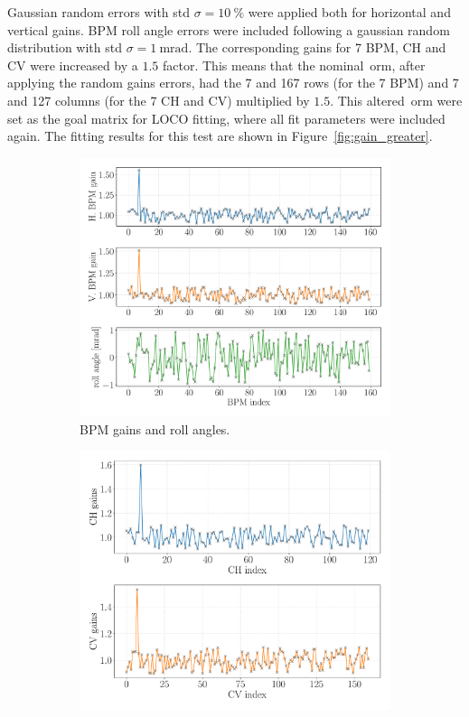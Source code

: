 Gaussian random errors with std $\sigma=\SI{10}{\%}$ were applied both for horizontal and vertical gains. BPM roll angle errors were included following a gaussian random distribution with std $\sigma=\SI{1}{\milli\radian}$.  The corresponding gains for 7 BPM, CH and CV were increased by a $1.5$ factor. This means that the nominal~\gls{orm}, after applying the random gains errors, had the 7 and 167 rows (for the 7 BPM) and 7 and 127 columns (for the 7 CH and CV) multiplied by $1.5$. This altered~\gls{orm} were set as the goal matrix for LOCO fitting, where all fit parameters were included again. The fitting results for this test are shown in Figure~\ref{fig:gain_greater}.
\begin{figure}[h!]
\centering
\begin{subfigure}[t]{0.49\textwidth}
\includegraphics[width=1.0\textwidth]{figures/bpm_gains_1p5gain_7th_bpm_grid_big.pdf}
    \caption{BPM gains and roll angles.}
    \label{subfig:bpm_fit_gain_greater}
\end{subfigure}
 \begin{subfigure}[t]{0.49\textwidth}
\includegraphics[width=1.0\textwidth]{figures/corr_gains_chcv_1p5_grid_big.pdf}

\end{subfigure}
\end{figure}

